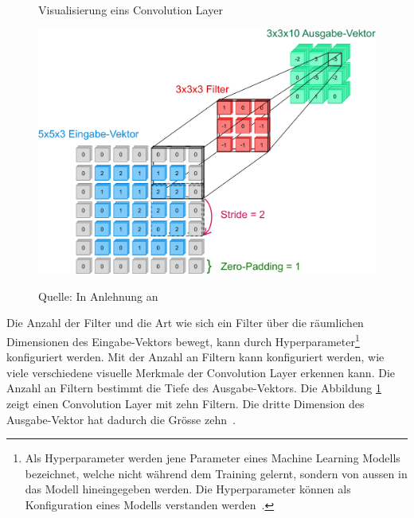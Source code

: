 \begin{figure}[h!]
    \captionsetup{width=.9\linewidth}
    \caption{Visualisierung eins Convolution Layer}
    \label{fig:conv:vis}
    \centering
    \includegraphics[scale=0.49]{graphics/cnn-visual.pdf}\\
    \vspace*{0.3cm}
    \caption*{Quelle: In Anlehnung an \textcite{CNN}}
\end{figure}

Die Anzahl der Filter und die Art wie sich ein Filter über die räumlichen Dimensionen des Eingabe-Vektors bewegt, kann durch Hyperparameter\footnote{Als Hyperparameter werden jene Parameter eines Machine Learning Modells bezeichnet, welche nicht während dem Training gelernt, sondern von aussen in das Modell hineingegeben werden. Die Hyperparameter können als Konfiguration eines Modells verstanden werden~\autocite{DesignML}.} konfiguriert werden. Mit der Anzahl an Filtern kann konfiguriert werden, wie viele verschiedene visuelle Merkmale der Convolution Layer erkennen kann. Die Anzahl an Filtern bestimmt die Tiefe des Ausgabe-Vektors. Die Abbildung \ref{fig:conv:vis} zeigt einen Convolution Layer mit zehn Filtern. Die dritte Dimension des Ausgabe-Vektor hat dadurch die Grösse zehn~\autocite{CNN}.

